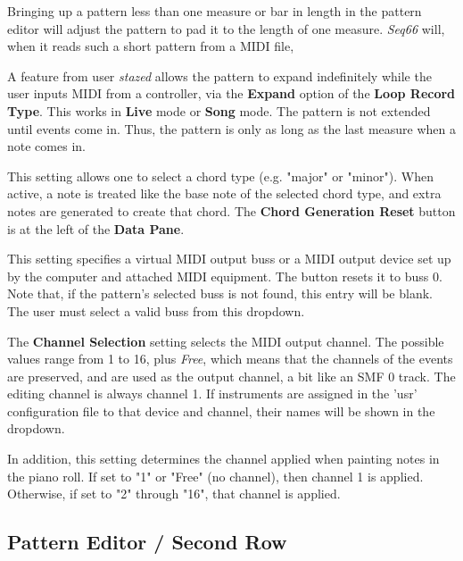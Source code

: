    Bringing up a pattern less than one measure or bar in
   length in the pattern editor will adjust the pattern to pad it to the
   length of one measure.
   \textsl{Seq66} will, when it reads such a short pattern
   from a MIDI file,

   A feature from user \textsl{stazed} allows the pattern to expand
   indefinitely while the user inputs MIDI from a controller, via the
   \textbf{Expand} option of the \textbf{Loop Record Type}.
   This works in \textbf{Live} mode or \textbf{Song} mode.
   The pattern is not extended until events come in.
   Thus, the pattern is only as long as the last measure when a note comes in.

   This setting allows one to select a chord type (e.g. "major" or "minor").
   When active, a note is treated like the base note of the selected chord
   type, and extra notes are generated to create that chord.
   The \textbf{Chord Generation Reset} button is at the left of the
   \textbf{Data Pane}.

   This setting specifies a virtual MIDI output buss or a
   MIDI output device set up by the computer and
   attached MIDI equipment.
   The button resets it to buss 0.
   Note that, if the pattern's selected buss is not found, this entry will be
   blank.  The user must select a valid buss from this dropdown.

   The \textbf{Channel Selection} setting selects the MIDI output channel.
   The possible values range from 1 to 16, plus \textsl{Free}, which means
   that the channels of the events are preserved, and are used as the output
   channel, a bit like an SMF 0 track.
   The editing channel is always channel 1.
   If instruments are assigned in the 'usr' configuration file
   to that device and channel, their names will be shown in the dropdown.

   In addition, this setting determines the channel applied when painting notes
   in the piano roll.  If set to "1" or "Free" (no channel), then channel 1 is
   applied.  Otherwise, if set to "2" through "16", that channel is applied.

\subsection{Pattern Editor / Second Row}
\label{subsec:pattern_editor_second_row}

